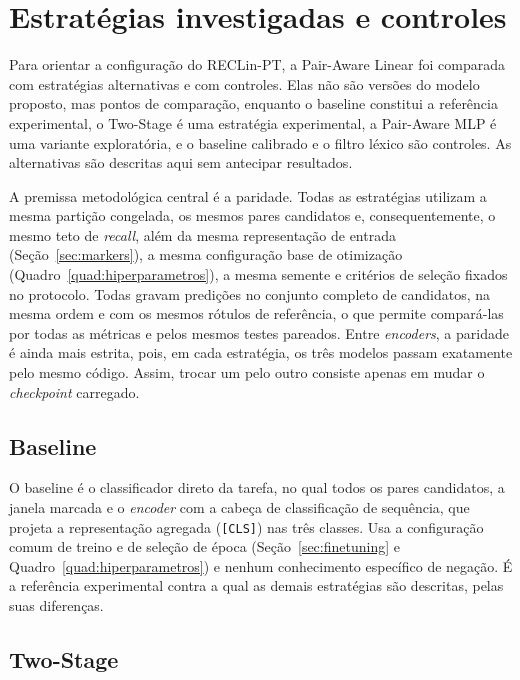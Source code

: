 \section{Estratégias investigadas e controles}
\label{sec:estrategias}
\label{sec:visao_baselines}

Para orientar a configuração do RECLin-PT, a Pair-Aware Linear foi comparada com
estratégias alternativas e com controles. Elas não são versões do modelo proposto, mas pontos de comparação, enquanto o baseline constitui a referência experimental, o Two-Stage é uma
estratégia experimental, a Pair-Aware MLP é uma variante exploratória, e o baseline
calibrado e o filtro léxico são controles. As alternativas são descritas aqui sem
antecipar resultados.

A premissa metodológica central é a paridade. Todas as estratégias utilizam a mesma partição congelada, os mesmos pares candidatos e, consequentemente, o mesmo teto de \emph{recall}, além da mesma representação de entrada (Seção~\ref{sec:markers}), a mesma
configuração base de otimização (Quadro~\ref{quad:hiperparametros}), a mesma semente e
critérios de seleção fixados no protocolo. Todas gravam predições no
conjunto completo de candidatos, na mesma ordem e com os mesmos rótulos de
referência, o que permite compará-las por todas as métricas e pelos mesmos testes
pareados. Entre \emph{encoders}, a paridade é ainda mais estrita, pois, em cada estratégia, os três modelos passam exatamente pelo mesmo código. Assim, trocar um pelo outro consiste apenas em mudar o \emph{checkpoint} carregado.

\subsection{Baseline}
\label{sec:baseline}

O baseline é o classificador direto da tarefa, no qual todos os pares candidatos, a janela
marcada e o \emph{encoder} com a cabeça de classificação de sequência, que projeta a
representação agregada (\texttt{[CLS]}) nas três classes. Usa a configuração comum
de treino e de seleção de época (Seção~\ref{sec:finetuning} e
Quadro~\ref{quad:hiperparametros}) e nenhum conhecimento específico de negação. É a
referência experimental contra a qual as demais estratégias são descritas, pelas suas
diferenças.

\subsection{Two-Stage}
\label{sec:twostage}

